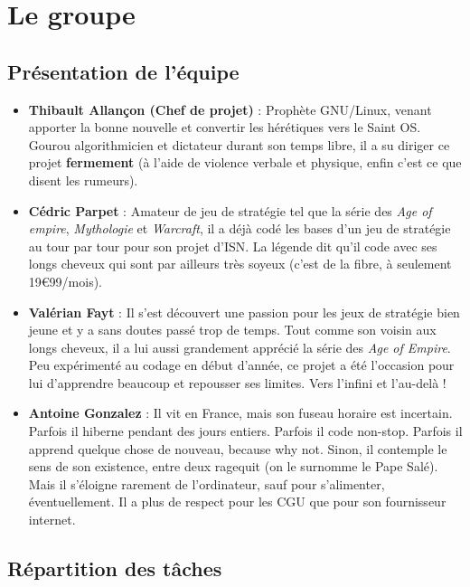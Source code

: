 \documentclass[12pt]{report}
\begin{document}
\chapter{Le groupe}

\section{Présentation de l'équipe}

\begin{itemize}[label=\textbullet]
    \item \textbf{Thibault Allançon (Chef de projet)} : Prophète GNU/Linux,
        venant apporter la bonne nouvelle et convertir les hérétiques vers le
        Saint OS. Gourou algorithmicien et dictateur durant son temps libre, il
        a su diriger ce projet \textbf{fermement} (à l’aide de violence verbale
        et physique, enfin c’est ce que disent les rumeurs).
    \item \textbf{Cédric Parpet} : Amateur de jeu de stratégie tel que la série
        des \textit{Age of empire}, \textit{Mythologie} et \textit{Warcraft}, il
        a déjà codé les bases d’un jeu de stratégie au tour par tour pour son
        projet d’ISN. La légende dit qu’il code avec ses longs cheveux qui sont
        par ailleurs très soyeux (c’est de la fibre, à seulement
        19\euro99/mois).
    \item \textbf{Valérian Fayt} : Il s’est découvert une passion pour les jeux
        de stratégie bien jeune et y a sans doutes passé trop de temps. Tout
        comme son voisin aux longs cheveux, il a lui aussi grandement apprécié
        la série des \textit{Age of Empire}. Peu expérimenté au codage en début
        d'année, ce projet a été l'occasion pour lui d'apprendre beaucoup et
        repousser ses limites. Vers l’infini et l’au-delà !
    \item \textbf{Antoine Gonzalez} : Il vit en France, mais son fuseau horaire
        est incertain. Parfois il hiberne pendant des jours entiers. Parfois il
        code non-stop. Parfois il apprend quelque chose de nouveau, because why
        not. Sinon, il contemple le sens de son existence, entre deux ragequit
        (on le surnomme le Pape Salé). Mais il s’éloigne rarement de
        l’ordinateur, sauf pour s’alimenter, éventuellement. Il a plus de
        respect pour les CGU que pour son fournisseur internet.
\end{itemize}

\section{Répartition des tâches}
\end{document}
